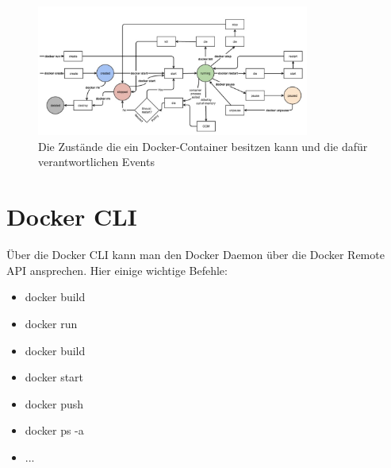 \begin{figure}[!ht]
  \centering
  \includegraphics[width=0.8\textwidth]{images/docker-api.jpg}
  \caption{Die Zustände die ein Docker-Container besitzen kann und die dafür verantwortlichen Events \cite{docker:api}}
\end{figure}


\section{Docker CLI}

Über die Docker CLI kann man den Docker Daemon über die Docker Remote API ansprechen. Hier einige wichtige Befehle:\\

\begin{itemize}
  \item docker build
  \item docker run
  \item docker build
  \item docker start
  \item docker push
  \item docker ps -a
  \item ...
\end{itemize}
